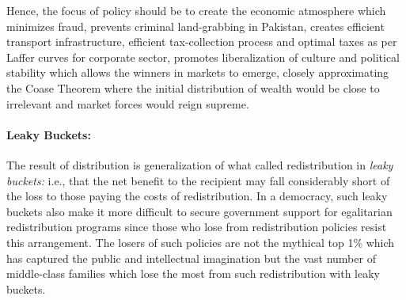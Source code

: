 \documentclass[12pt]{article}
\newcommand{\1}{\mathbbm 1}
\begin{document}
		Hence, the focus of policy should be to create the economic atmosphere which minimizes fraud, prevents criminal land-grabbing in Pakistan, creates efficient transport infrastructure, efficient tax-collection process and optimal taxes as per Laffer curves for corporate sector, promotes liberalization of culture and political stability which allows the winners in markets to emerge, closely approximating the Coase Theorem where the initial distribution of wealth would be close to irrelevant and market forces would reign supreme.
		
		
		
		
		
		
		
		 
		 \paragraph{Leaky Buckets:}The result of distribution is generalization of what \cite{okun1975big} called redistribution in \textit{leaky buckets:} i.e., that the net benefit to the recipient may fall considerably short of the loss to those paying the costs of redistribution. In a democracy, such leaky buckets also make it more difficult to secure government support for egalitarian redistribution programs since those who lose from redistribution policies resist this arrangement. The losers of such policies are not the mythical top 1\% which has captured the public and intellectual imagination but the vast number of middle-class families which lose the most from such redistribution with leaky buckets.
		 
\end{document}
